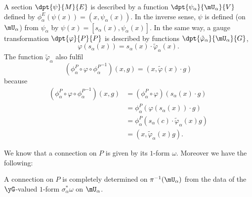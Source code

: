 A section $\dpt{\psi}{M}{E}$ is described by a function $\dpt{\psi_{\alpha}}{\mU_{\alpha}}{V}$ defined by $\phi^E_{\alpha}(\psi(x))=(x,\psi_{\alpha}(x))$.  In the inverse sense, $\psi$ is defined (on $\mU_{\alpha}$) from $\psi_{\alpha}$ by
$\psi(x)=[s_{\alpha}(x),\psi_{\alpha}(x)]$.
In the same way, a gauge transformation $\dpt{\varphi}{P}{P}$ is described by functions $\dpt{\tilde{\varphi}_{\alpha}}{\mU_{\alpha}}{G}$,
\begin{equation}
  \varphi(s_{\alpha}(x))=s_{\alpha}(x)\cdot\tilde{\varphi}_{\alpha}(x).
\end{equation}
The function $\tilde{\varphi}_{\alpha}$ also fulfil
\begin{equation}
  (\phi_{\alpha}^P\circ\varphi\circ{\phi_{\alpha}^P}^{-1})(x,g)=(x,\tilde{\varphi}(x)\cdot g) 
\end{equation}
because
\begin{equation}
\begin{split}
  (\phi_{\alpha}^P\circ\varphi\circ{\phi_{\alpha}^P}^{-1})(x,g)&=(\phi_{\alpha}^P\circ\varphi)(s_{\alpha}(x)\cdot g)\\
                                                      &=\phi_{\alpha}^P( \varphi(s_{\alpha}(x))\cdot g )\\
                                                      &=\phi_{\alpha}^P( s_{\alpha}(c)\cdot\tilde{\varphi}_{\alpha}(x)g)\\
                                                      &=(x,\tilde{\varphi}_{\alpha}(x)g).
\end{split}
\end{equation}

We know that a connection on $P$ is given by its $1$-form $\omega$. Moreover we have the following:
\begin{proposition}
A connection on $P$ is completely determined on $\pi^{-1}(\mU_{\alpha})$ from the data of the $\yG$-valued $1$-form $\sigma_{\alpha}^*\omega$ on $\mU_{\alpha}$.
\end{proposition}


